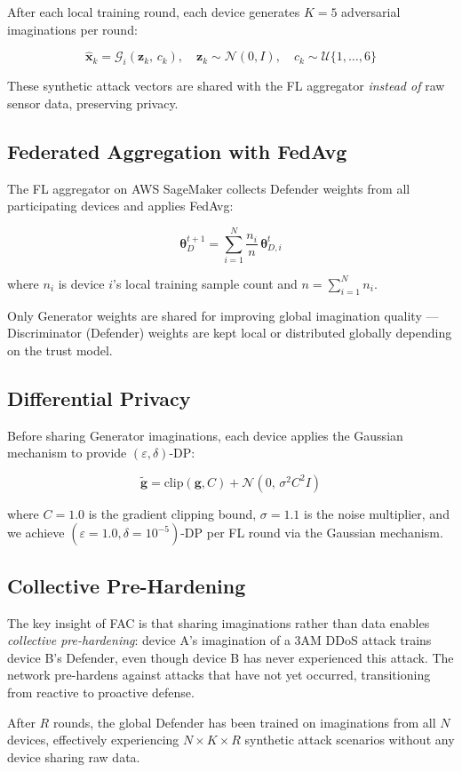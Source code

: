 After each local training round, each device generates $K = 5$ adversarial
imaginations per round:

\begin{equation}
\hat{\mathbf{x}}_k = \mathcal{G}_i(\mathbf{z}_k,\, c_k),\quad
\mathbf{z}_k \sim \mathcal{N}(0, I),\quad
c_k \sim \mathcal{U}\{1, \ldots, 6\}
\label{eq:imagination}
\end{equation}

These synthetic attack vectors are shared with the FL aggregator
\emph{instead of} raw sensor data, preserving privacy.

\subsection{Federated Aggregation with FedAvg}

The FL aggregator on AWS SageMaker collects Defender weights from all
participating devices and applies FedAvg:

\begin{equation}
\boldsymbol{\theta}_D^{t+1} = \sum_{i=1}^{N} \frac{n_i}{n}\,\boldsymbol{\theta}_{D,i}^t
\label{eq:fedavg}
\end{equation}

where $n_i$ is device $i$'s local training sample count and
$n = \sum_{i=1}^N n_i$.

Only Generator weights are shared for improving global imagination quality —
Discriminator (Defender) weights are kept local or distributed globally
depending on the trust model.

\subsection{Differential Privacy}

Before sharing Generator imaginations, each device applies the Gaussian
mechanism to provide $(\varepsilon, \delta)$-DP:

\begin{equation}
\tilde{\mathbf{g}} = \text{clip}(\mathbf{g}, C) + \mathcal{N}\!\left(0,\, \sigma^2 C^2 I\right)
\label{eq:dp}
\end{equation}

where $C = 1.0$ is the gradient clipping bound, $\sigma = 1.1$ is the
noise multiplier, and we achieve $(\varepsilon = 1.0, \delta = 10^{-5})$-DP
per FL round via the Gaussian mechanism.

\subsection{Collective Pre-Hardening}

The key insight of FAC is that sharing imaginations rather than data enables
\emph{collective pre-hardening}: device A's imagination of a 3AM DDoS attack
trains device B's Defender, even though device B has never experienced this
attack. The network pre-hardens against attacks that have not yet occurred,
transitioning from reactive to proactive defense.

After $R$ rounds, the global Defender has been trained on imaginations from
all $N$ devices, effectively experiencing $N \times K \times R$ synthetic
attack scenarios without any device sharing raw data.
